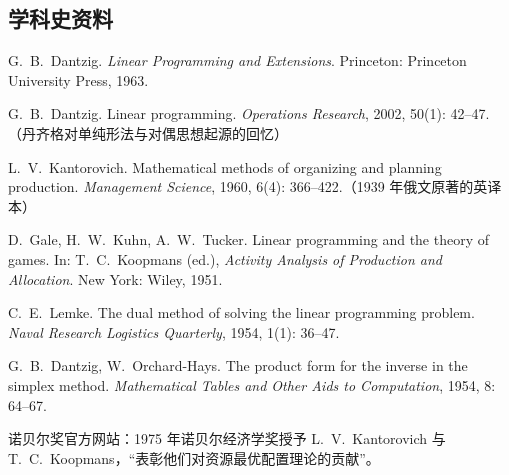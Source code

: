 \subsection*{学科史资料}
\begin{enumerate}[label={[\arabic*]},leftmargin=2.2em,resume]
  \item G.~B.~Dantzig. \emph{Linear Programming and Extensions}. Princeton: Princeton University Press, 1963.
  \item G.~B.~Dantzig. Linear programming. \emph{Operations Research}, 2002, 50(1): 42--47.（丹齐格对单纯形法与对偶思想起源的回忆）
  \item L.~V.~Kantorovich. Mathematical methods of organizing and planning production. \emph{Management Science}, 1960, 6(4): 366--422.（1939 年俄文原著的英译本）
  \item D.~Gale, H.~W.~Kuhn, A.~W.~Tucker. Linear programming and the theory of games. In: T.~C.~Koopmans (ed.), \emph{Activity Analysis of Production and Allocation}. New York: Wiley, 1951.
  \item C.~E.~Lemke. The dual method of solving the linear programming problem. \emph{Naval Research Logistics Quarterly}, 1954, 1(1): 36--47.
  \item G.~B.~Dantzig, W.~Orchard-Hays. The product form for the inverse in the simplex method. \emph{Mathematical Tables and Other Aids to Computation}, 1954, 8: 64--67.
  \item 诺贝尔奖官方网站：1975 年诺贝尔经济学奖授予 L.~V.~Kantorovich 与 T.~C.~Koopmans，“表彰他们对资源最优配置理论的贡献”。
\end{enumerate}


